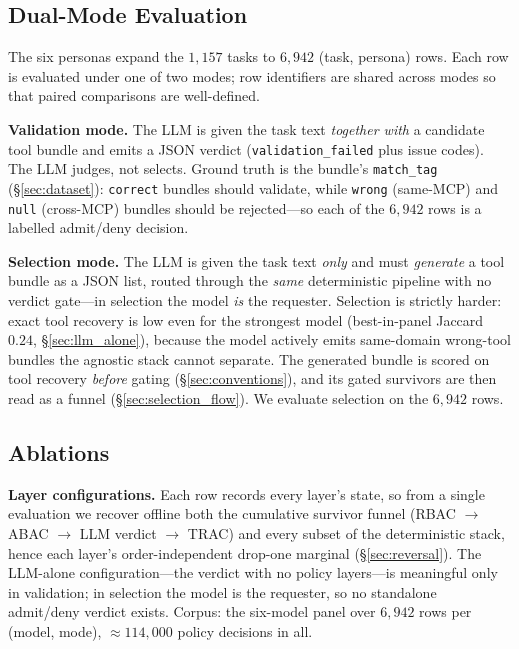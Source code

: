 \documentclass[sigconf,review,anonymous]{acmart}
\begin{document}
\subsection{Dual-Mode Evaluation}
\label{sec:dual_mode}

The six personas expand the $1{,}157$ tasks to $6{,}942$ (task, persona) rows. Each row is evaluated under one of two modes; row identifiers are shared across modes so that paired comparisons are well-defined.

\textbf{Validation mode.} The LLM is given the task text \emph{together with} a candidate tool bundle and emits a JSON verdict (\texttt{validation\_failed} plus issue codes). The LLM judges, not selects. Ground truth is the bundle's \texttt{match\_tag} (\S\ref{sec:dataset}): \texttt{correct} bundles should validate, while \texttt{wrong} (same-MCP) and \texttt{null} (cross-MCP) bundles should be rejected---so each of the $6{,}942$ rows is a labelled admit/deny decision.

\textbf{Selection mode.} The LLM is given the task text \emph{only} and must \emph{generate} a tool bundle as a JSON list, routed through the \emph{same} deterministic pipeline with no verdict gate---in selection the model \emph{is} the requester. Selection is strictly harder: exact tool recovery is low even for the strongest model (best-in-panel Jaccard $0.24$, \S\ref{sec:llm_alone}), because the model actively emits same-domain wrong-tool bundles the agnostic stack cannot separate. The generated bundle is scored on tool recovery \emph{before} gating (\S\ref{sec:conventions}), and its gated survivors are then read as a funnel (\S\ref{sec:selection_flow}). We evaluate selection on the $6{,}942$ rows.

\subsection{Ablations}
\label{sec:ablation_design}

\textbf{Layer configurations.} Each row records every layer's state, so from a single evaluation we recover offline both the cumulative survivor funnel (RBAC $\to$ ABAC $\to$ LLM verdict $\to$ TRAC) and every subset of the deterministic stack, hence each layer's order-independent drop-one marginal (\S\ref{sec:reversal}). The LLM-alone configuration---the verdict with no policy layers---is meaningful only in validation; in selection the model is the requester, so no standalone admit/deny verdict exists. Corpus: the six-model panel over $6{,}942$ rows per (model, mode), $\approx\!114{,}000$ policy decisions in all.
\end{document}

